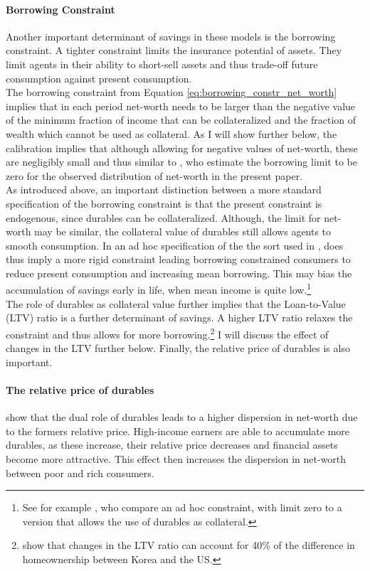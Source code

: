 \documentclass[a4paper,12pt,legno]{article}
\begin{document}
\paragraph{Borrowing Constraint} Another important determinant of savings in these models is the borrowing constraint. A tighter constraint limits the insurance potential of assets. They limit agents in their ability to short-sell assets and thus trade-off future consumption against present consumption. \\ 
The borrowing constraint from Equation \ref{eq:borrowing_constr_net_worth} implies that in each period net-worth needs to be larger than the negative value of the minimum fraction of income that can be collateralized and the fraction of wealth which cannot be used as collateral. As I will show further below, the calibration implies that although allowing for negative values of net-worth, these are negligibly small and thus similar to \cite{hintermaier2011}, who estimate the borrowing limit to be zero for the observed distribution of net-worth in the present paper. 
\\ 
As introduced above, an important distinction between a more standard specification of the borrowing constraint is that the present constraint is endogenous, since durables can be collateralized. Although, the limit for net-worth may be similar, the collateral value of durables still allows agents to smooth consumption. In an ad hoc specification of the the sort used in \cite{hintermaier2011}, does thus imply a more rigid constraint leading borrowing constrained consumers to reduce present consumption and increasing mean borrowing. This may bias the accumulation of savings early in life, when mean income is quite low.\footnote{See for example \cite{FV&K2011}, who compare an ad hoc constraint, with limit zero to a version that allows the use of durables as collateral.} \\ The role of durables as collateral value further implies that the Loan-to-Value (LTV) ratio is a further determinant of savings. A higher LTV ratio relaxes the constraint and thus allows for more borrowing.\footnote{\cite{cho2012accounting} show that changes in the LTV ratio can account for 40\% of the difference in homeownership between Korea and the US.} I will discuss the effect of changes in the LTV further below.
Finally, the relative price of durables is also important.

\paragraph{The relative price of durables} \cite{FV&K2011} show that the dual role of durables leads to a higher dispersion in net-worth due to the formers relative price. High-income earners are able to accumulate more durables, as these increase, their relative price decreases and financial assets become more attractive. This effect then increases the dispersion in net-worth between poor and rich consumers. 
\end{document}

